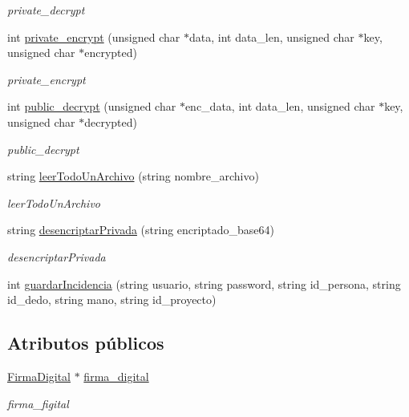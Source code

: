 \begin{DoxyCompactItemize}
\begin{DoxyCompactList}\small\item\em private\+\_\+decrypt \end{DoxyCompactList}\item 
int \hyperlink{classTemplateAFIS__webservice_ad332d60ad475ff5ec824d4a004defb45}{private\+\_\+encrypt} (unsigned char $\ast$data, int data\+\_\+len, unsigned char $\ast$key, unsigned char $\ast$encrypted)
\begin{DoxyCompactList}\small\item\em private\+\_\+encrypt \end{DoxyCompactList}\item 
int \hyperlink{classTemplateAFIS__webservice_a881bbae5e1b28f4bb6e821f7cae1fdde}{public\+\_\+decrypt} (unsigned char $\ast$enc\+\_\+data, int data\+\_\+len, unsigned char $\ast$key, unsigned char $\ast$decrypted)
\begin{DoxyCompactList}\small\item\em public\+\_\+decrypt \end{DoxyCompactList}\item 
string \hyperlink{classTemplateAFIS__webservice_a432d8a18012883bacddf5f9db4b58b69}{leer\+Todo\+Un\+Archivo} (string nombre\+\_\+archivo)
\begin{DoxyCompactList}\small\item\em leer\+Todo\+Un\+Archivo \end{DoxyCompactList}\item 
string \hyperlink{classTemplateAFIS__webservice_a4da03ee6cb795586858c4a09f3cdc789}{desencriptar\+Privada} (string encriptado\+\_\+base64)
\begin{DoxyCompactList}\small\item\em desencriptar\+Privada \end{DoxyCompactList}\item 
int \hyperlink{classTemplateAFIS__webservice_aa4536bcf883164f6c3c6d9dcb8744c7f}{guardar\+Incidencia} (string usuario, string password, string id\+\_\+persona, string id\+\_\+dedo, string mano, string id\+\_\+proyecto)
\end{DoxyCompactItemize}
\subsection*{Atributos públicos}
\begin{DoxyCompactItemize}
\item 
\hyperlink{classFirmaDigital}{Firma\+Digital} $\ast$ \hyperlink{classTemplateAFIS__webservice_a829e57a86d8c1c0b17631eebf8a8e0cf}{firma\+\_\+digital}
\begin{DoxyCompactList}\small\item\em firma\+\_\+figital \end{DoxyCompactList}\end{DoxyCompactItemize}
